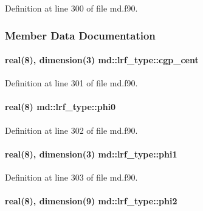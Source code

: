 Definition at line 300 of file md.\-f90.



\subsubsection{Member Data Documentation}
\hypertarget{structmd_1_1lrf__type_ab136a9bf0c7aaedc4f227688b43ee96f}{
\paragraph[{cgp\-\_\-cent}]{\setlength{\rightskip}{0pt plus 5cm}real(8), dimension(3) md\-::lrf\-\_\-type\-::cgp\-\_\-cent}}\label{structmd_1_1lrf__type_ab136a9bf0c7aaedc4f227688b43ee96f}


Definition at line 301 of file md.\-f90.

\hypertarget{structmd_1_1lrf__type_ab374aa816bf16b2cc35cd5c994cf91bb}{
\paragraph[{phi0}]{\setlength{\rightskip}{0pt plus 5cm}real(8) md\-::lrf\-\_\-type\-::phi0}}\label{structmd_1_1lrf__type_ab374aa816bf16b2cc35cd5c994cf91bb}


Definition at line 302 of file md.\-f90.

\hypertarget{structmd_1_1lrf__type_a61e0a8229f18e076c41ac380e28c63e6}{
\paragraph[{phi1}]{\setlength{\rightskip}{0pt plus 5cm}real(8), dimension(3) md\-::lrf\-\_\-type\-::phi1}}\label{structmd_1_1lrf__type_a61e0a8229f18e076c41ac380e28c63e6}


Definition at line 303 of file md.\-f90.

\hypertarget{structmd_1_1lrf__type_a8994cc776422b59856dddb5455a802a8}{
\paragraph[{phi2}]{\setlength{\rightskip}{0pt plus 5cm}real(8), dimension(9) md\-::lrf\-\_\-type\-::phi2}}\label{structmd_1_1lrf__type_a8994cc776422b59856dddb5455a802a8}


